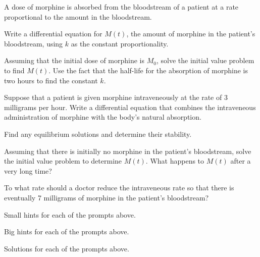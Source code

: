 \begin{activity} \label{A:7.5.iv}  
A dose of morphine is 
        absorbed from the bloodstream of a patient at a rate
        proportional to the amount in the bloodstream.  

        \ba
        \item Write a differential equation for $M(t)$, the amount of
          morphine in the patient's bloodstream, using $k$ as the
          constant proportionality.
        \item 
          Assuming that the initial dose of morphine is $M_0$,
          solve the initial value problem to find $M(t)$.  Use the
          fact that the half-life for the absorption of morphine is
          two hours to find the constant $k$.
        \item Suppose that a patient is given morphine intraveneously
          at the rate of 3 milligrams per hour.  Write a differential
          equation that combines the intraveneous administration of
          morphine with the body's natural absorption.
        \item Find any equilibrium solutions and determine their
          stability. 
        \item Assuming that there is initially no morphine in the
          patient's bloodstream, solve the initial value problem to
          determine $M(t)$.  What happens to $M(t)$ after a very long time?
        \item To what rate should a doctor reduce the
          intraveneous rate so that there is eventually 7 milligrams
          of morphine in the patient's bloodstream?

\ea
\end{activity}
\begin{smallhint}
\ba
	\item Small hints for each of the prompts above.
\ea
\end{smallhint}
\begin{bighint}
\ba
	\item Big hints for each of the prompts above.
\ea
\end{bighint}
\begin{activitySolution}
\ba
	\item Solutions for each of the prompts above.
\ea
\end{activitySolution}
\aftera